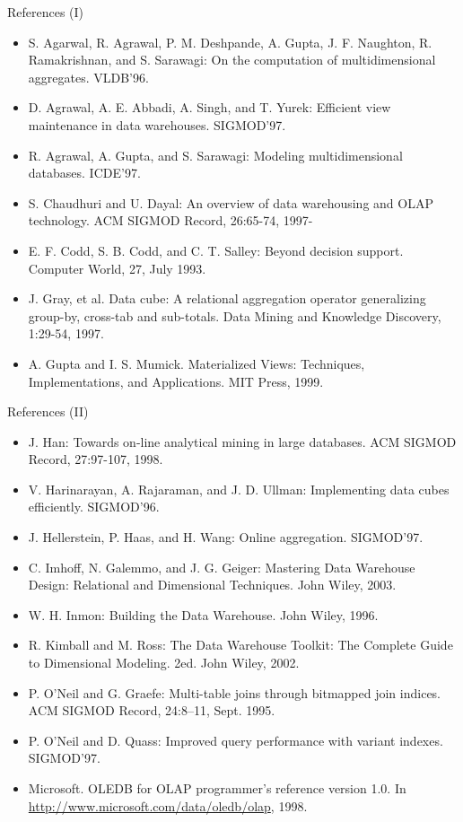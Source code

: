 \documentclass[aspectratio=169,t]{beamer}
\begin{document}
  {
    \begin{frame}{References (I)}
    \begin{itemize}
      \item S. Agarwal, R. Agrawal, P. M. Deshpande, A. Gupta, J. F. Naughton, R. Ramakrishnan, and S. Sarawagi: On the computation of multidimensional aggregates. VLDB'96.
      \item D. Agrawal, A. E. Abbadi, A. Singh, and T. Yurek: Efficient view maintenance in data warehouses. SIGMOD'97.
      \item R. Agrawal, A. Gupta, and S. Sarawagi: Modeling multidimensional databases.  ICDE'97.
      \item {\color{airforceblue}S. Chaudhuri and U. Dayal: An overview of data warehousing and OLAP technology. ACM SIGMOD Record, 26:65-74, 1997-}
      \item E. F. Codd, S. B. Codd, and C. T. Salley: Beyond decision support. Computer World, 27, July 1993.
      \item J. Gray, et al. Data cube: A relational aggregation operator generalizing group-by, cross-tab and sub-totals. Data Mining and Knowledge Discovery, 1:29-54, 1997.
      \item A. Gupta and I. S. Mumick.  Materialized Views: Techniques, Implementations, and Applications. MIT Press, 1999.
    \end{itemize}
    \end{frame}
  }

  {
    \begin{frame}{References (II)}
    \begin{itemize}
      \item J. Han:  Towards on-line analytical mining in large databases. ACM SIGMOD Record, 27:97-107, 1998.
      \item V. Harinarayan, A. Rajaraman, and J. D. Ullman: Implementing data cubes efficiently. SIGMOD'96.
      \item J. Hellerstein, P. Haas, and H. Wang: Online aggregation. SIGMOD'97.
      \item C. Imhoff, N. Galemmo, and J. G. Geiger: Mastering Data Warehouse Design: Relational and Dimensional Techniques. John Wiley, 2003.
      \item W. H. Inmon: Building the Data Warehouse. John Wiley, 1996.
      \item R. Kimball and M. Ross: The Data Warehouse Toolkit: The Complete Guide to Dimensional Modeling. 2ed. John Wiley, 2002.
      \item P. O’Neil and G. Graefe: Multi-table joins through bitmapped join indices. ACM SIGMOD Record, 24:8–11, Sept. 1995.
      \item P. O'Neil and D. Quass: Improved query performance with variant indexes. SIGMOD'97.
      \item Microsoft. OLEDB for OLAP programmer's reference version 1.0. In \href{http://www.microsoft.com/data/oledb/olap}{http://www.microsoft.com/data/oledb/olap}, 1998.
    \end{itemize}
    \end{frame}
  }
\end{document}
